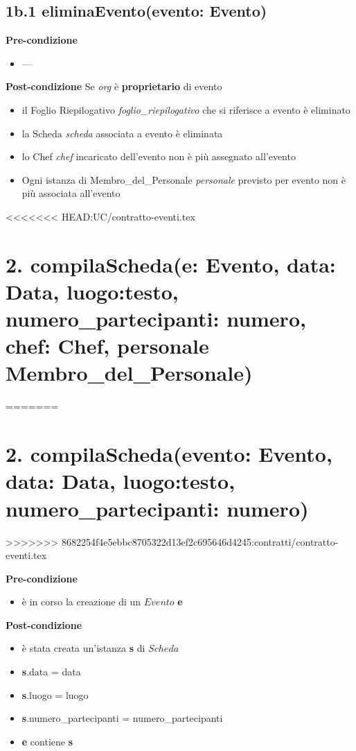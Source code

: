 \documentclass[12pt]{extarticle}
\begin{document}
\subsection*{1b.1 eliminaEvento(evento: Evento)}

\textbf{Pre-condizione}
\begin{itemize}
  \item ---
\end{itemize}
\textbf{Post-condizione} Se \textit{org} è \textbf{proprietario} di evento
\begin{itemize}
  \item il Foglio Riepilogativo \textit{foglio\_riepilogativo} che si riferisce a evento è eliminato
  \item la Scheda \textit{scheda} associata a evento è eliminata
  \item lo Chef \textit{chef} incaricato dell'evento non è più assegnato all'evento
  \item Ogni istanza di Membro\_del\_Personale \textit{personale} previsto per evento non è più associata all'evento
\end{itemize}


<<<<<<< HEAD:UC/contratto-eventi.tex
\section*{2. compilaScheda(e: Evento, data: Data, luogo:testo, numero\_partecipanti: numero, chef: Chef, personale Membro\_del\_Personale)}
=======
\section*{2. compilaScheda(evento: Evento, data: Data, luogo:testo, numero\_partecipanti: numero)}
>>>>>>> 8682254f4e5ebbc8705322d13ef2c695646d4245:contratti/contratto-eventi.tex

\textbf{Pre-condizione}
\begin{itemize}
  \item è in corso la creazione di un $Evento$ \textbf{e}
\end{itemize} 
\textbf{Post-condizione} 
\begin{itemize}
  \item è stata creata un'istanza \textbf{s} di $Scheda$
  \item \textbf{s}.data = data
  \item \textbf{s}.luogo = luogo
  \item \textbf{s}.numero\_partecipanti = numero\_partecipanti
  \item \textbf{e} contiene \textbf{s}
\end{itemize}
\end{document}
